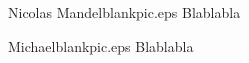 \documentclass[twocolumn,letterpaper]{IEEEAerospaceCLS}  %
\begin{document}




\thebiography
\begin{biographywithpic}{Nicolas Mandel}{blankpic.eps}
Blablabla
\end{biographywithpic} 

\begin{biographywithpic}{Michael}{blankpic.eps}
Blablabla
\end{biographywithpic}
\end{document}

